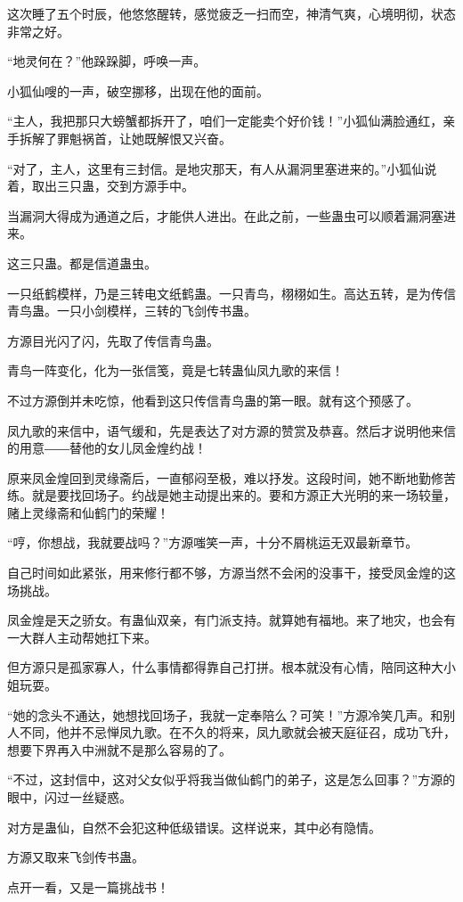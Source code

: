 \begin{this_body}
这次睡了五个时辰，他悠悠醒转，感觉疲乏一扫而空，神清气爽，心境明彻，状态非常之好。

“地灵何在？”他跺跺脚，呼唤一声。

小狐仙嗖的一声，破空挪移，出现在他的面前。

“主人，我把那只大螃蟹都拆开了，咱们一定能卖个好价钱！”小狐仙满脸通红，亲手拆解了罪魁祸首，让她既解恨又兴奋。

“对了，主人，这里有三封信。是地灾那天，有人从漏洞里塞进来的。”小狐仙说着，取出三只蛊，交到方源手中。

当漏洞大得成为通道之后，才能供人进出。在此之前，一些蛊虫可以顺着漏洞塞进来。

这三只蛊。都是信道蛊虫。

一只纸鹤模样，乃是三转电文纸鹤蛊。一只青鸟，栩栩如生。高达五转，是为传信青鸟蛊。一只小剑模样，三转的飞剑传书蛊。

方源目光闪了闪，先取了传信青鸟蛊。

青鸟一阵变化，化为一张信笺，竟是七转蛊仙凤九歌的来信！

不过方源倒并未吃惊，他看到这只传信青鸟蛊的第一眼。就有这个预感了。

凤九歌的来信中，语气缓和，先是表达了对方源的赞赏及恭喜。然后才说明他来信的用意――替他的女儿凤金煌约战！

原来凤金煌回到灵缘斋后，一直郁闷至极，难以抒发。这段时间，她不断地勤修苦练。就是要找回场子。约战是她主动提出来的。要和方源正大光明的来一场较量，赌上灵缘斋和仙鹤门的荣耀！

“哼，你想战，我就要战吗？”方源嗤笑一声，十分不屑桃运无双最新章节。

自己时间如此紧张，用来修行都不够，方源当然不会闲的没事干，接受凤金煌的这场挑战。

凤金煌是天之骄女。有蛊仙双亲，有门派支持。就算她有福地。来了地灾，也会有一大群人主动帮她扛下来。

但方源只是孤家寡人，什么事情都得靠自己打拼。根本就没有心情，陪同这种大小姐玩耍。

“她的念头不通达，她想找回场子，我就一定奉陪么？可笑！”方源冷笑几声。和别人不同，他并不忌惮凤九歌。在不久的将来，凤九歌就会被天庭征召，成功飞升，想要下界再入中洲就不是那么容易的了。

“不过，这封信中，这对父女似乎将我当做仙鹤门的弟子，这是怎么回事？”方源的眼中，闪过一丝疑惑。

对方是蛊仙，自然不会犯这种低级错误。这样说来，其中必有隐情。

方源又取来飞剑传书蛊。

点开一看，又是一篇挑战书！


\end{this_body}
